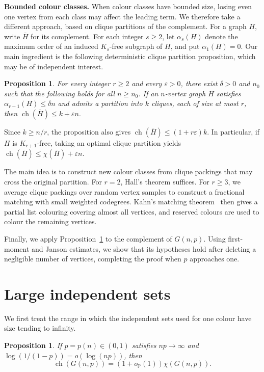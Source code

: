 \documentclass[11pt]{article}
\newtheorem{proposition}[theorem]{Proposition}
\numberwithin{equation}{section}
\newcommand{\ch}{\operatorname{ch}}
\newcommand{\op}{o_{\mathbb P}}
\newcommand{\ov}[1]{\overline{#1}}
\begin{document}
\medskip
\noindent\textbf{Bounded colour classes.}
When colour classes have bounded size, losing even one
vertex from each class may affect the leading term.
We therefore take a different approach, based on clique
partitions of the complement.
For a graph $H$, write $\ov H$ for its complement.
For each integer $s\ge2$, let $\alpha_s(H)$ denote the
maximum order of an induced $K_s$-free subgraph of $H$,
and put $\alpha_1(H)=0$.
Our main ingredient is the following deterministic clique partition
proposition, which may be of independent interest.


\begin{proposition}\label{prop:lifting}
For every integer $r\ge2$ and every $\varepsilon>0$,
there exist $\delta>0$ and $n_0$ such that the following
holds for all $n\ge n_0$.
If an $n$-vertex graph $H$ satisfies
$\alpha_{r-1}(H)\le\delta n$ and admits a partition
into $k$ cliques, each of size at most $r$, then
$
 \ch(\ov H)\le k+\varepsilon n.
$
\end{proposition}


Since $k\ge n/r$, the proposition also gives
$\ch(\ov H)\le(1+r\varepsilon)k$.
In particular, if $H$ is $K_{r+1}$-free, taking an
optimal clique partition yields
$\ch(\ov H)\le\chi(\ov H)+\varepsilon n$.

The main idea is to construct new colour classes
from clique packings that may cross the original
partition. For $r=2$, Hall's theorem suffices.
For $r\ge3$, we average clique packings over random
vertex samples to construct a fractional matching
with small weighted codegrees. Kahn's matching
theorem~\cite{KahnLP} then gives a partial list
colouring covering almost all vertices, and reserved
colours are used to colour the remaining vertices.

Finally, we apply Proposition~\ref{prop:lifting}
to the complement of $G(n,p)$.
Using first-moment and Janson estimates, we show
that its hypotheses hold after deleting a negligible
number of vertices, completing the proof when
$p$ approaches one.


\section{Large independent sets}\label{sec:growing}

We first treat the range in which the independent sets used for one colour have size tending to infinity.


\begin{proposition}\label{prop:growing}
If $p=p(n)\in(0,1)$ satisfies $np\to\infty$ and
$\log(1/(1-p))=o(\log(np))$, then
\[
 \ch(G(n,p))=(1+\op(1))\chi(G(n,p)).
\]
\end{proposition}
\end{document}
